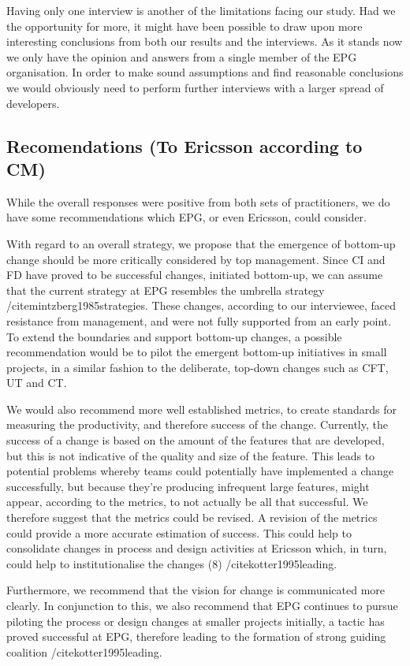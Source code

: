 \documentclass[final_report_innit.tex]{subfiles}
\begin{document}
Having only one interview is another of the limitations facing our study. Had we the opportunity for more, it might have been possible to draw upon more interesting conclusions from both our results and the interviews. As it stands now we only have the opinion and answers from a single member of the EPG organisation. In order to make sound assumptions and find reasonable conclusions we would obviously need to perform further interviews with a larger spread of developers.

\subsection*{Recomendations (To Ericsson according to CM)}

While the overall responses were positive from both sets of practitioners, we do have some recommendations which EPG, or even Ericsson, could consider. 

With regard to an overall strategy, we propose that the emergence of bottom-up change should be more critically considered by top management. Since CI and FD have proved to be successful changes, initiated bottom-up, we can assume that the current strategy at EPG resembles the umbrella strategy /cite{mintzberg1985strategies}. These changes, according to our interviewee, faced resistance from management, and were not fully supported from an early point. To extend the boundaries and support bottom-up changes, a possible recommendation would be to pilot the emergent bottom-up initiatives in small projects, in a similar fashion to the deliberate, top-down changes such as CFT, UT and CT. 

We would also recommend more well established metrics, to create standards for measuring the productivity, and therefore success of the change. Currently, the success of a change is based on the amount of the features that are developed, but this is not indicative of the quality and size of the feature. This leads to potential problems whereby teams could potentially have implemented a change successfully, but because they’re producing infrequent large features, might appear, according to the metrics, to not actually be all that successful. We therefore suggest that the metrics could be revised. A revision of the metrics could provide a more accurate estimation of success. This could help to consolidate changes in process and design activities at Ericsson which, in turn, could help to institutionalise the changes (8) /cite{kotter1995leading}.

Furthermore, we recommend that the vision for change is communicated more clearly. In conjunction to this, we also recommend that EPG continues to pursue piloting the process or design changes at smaller projects initially, a tactic has proved successful at EPG, therefore leading to the formation of strong guiding coalition /cite{kotter1995leading}.
\end{document}
